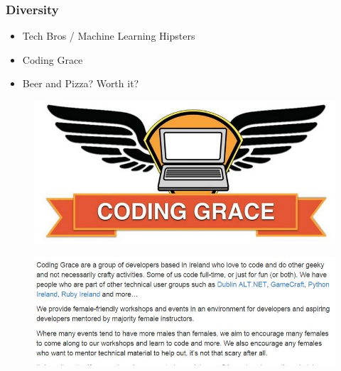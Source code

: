 \documentclass{beamer}
\begin{document}

\begin{frame}
	\frametitle{Diversity}
\Large
\begin{itemize}
\item Tech Bros / Machine Learning Hipsters
\item Coding Grace
\item Beer and Pizza? Worth it?
\end{itemize}
\end{frame}

\begin{frame}
	\begin{figure}
		\centering
		\includegraphics[width=0.99\linewidth]{codinggracelogo}
		
	\end{figure}
	
\end{frame}
\begin{frame}
	\begin{figure}
		\centering
		\includegraphics[width=0.99\linewidth]{codinggraceabout}
		
	\end{figure}
	
\end{frame}
\end{document}

